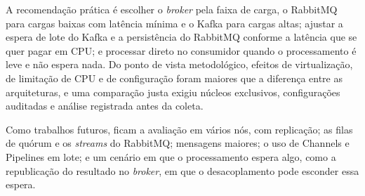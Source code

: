 \documentclass[12pt]{article}
\begin{document}
A recomendação prática é escolher o \textit{broker} pela faixa de carga, o RabbitMQ para cargas
baixas com latência mínima e o Kafka para cargas altas; ajustar a espera de lote do Kafka
e a persistência do RabbitMQ conforme a latência que se quer pagar em CPU; e processar
direto no consumidor quando o processamento é leve e não espera nada. Do ponto de vista
metodológico, efeitos de virtualização, de limitação de CPU e de configuração foram
maiores que a diferença entre as arquiteturas, e uma comparação justa exigiu núcleos
exclusivos, configurações auditadas e análise registrada antes da coleta.

Como trabalhos futuros, ficam a avaliação em vários nós, com replicação; as filas de
quórum e os \textit{streams} do RabbitMQ; mensagens maiores; o uso de Channels e
Pipelines em lote; e um cenário em que o processamento espera algo, como a republicação do
resultado no \textit{broker}, em que o desacoplamento pode esconder essa espera.




\end{document}
